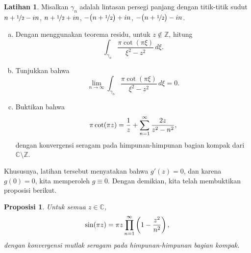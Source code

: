 \documentclass[12pt,openany]{book}
\newcommand{\avoidbreak}{\postdisplaypenalty=100}
\newcommand{\C}{{\mathbb{C}}}
\newcommand{\Z}{{\mathbb{Z}}}
\theoremstyle{plain}
\newtheorem{prop}[thm]{Proposisi}
\theoremstyle{remark}
\theoremstyle{definition}
\newenvironment{exbox}{%
    \def\FrameCommand{\vrule width 1pt \relax\hspace{10pt}}%
    \MakeFramed{\advance\hsize-\width\FrameRestore}%
}{%
    \endMakeFramed
}
\newenvironment{exparts}{%
    \leavevmode\begin{enumerate}[a),noitemsep,topsep=0pt,parsep=0pt,partopsep=0pt]
}{%
    \end{enumerate}
}
\theoremstyle{exercise}
\newtheorem{exercise}{Latihan}[section]
\theoremstyle{example}
\begin{document}
\begin{exbox}
\begin{exercise}
Misalkan $\gamma_n$ adalah lintasan persegi panjang dengan titik-titik sudut
$n+\nicefrac{1}{2} - in$, 
$n+\nicefrac{1}{2} + in$, 
$-\bigl(n+\nicefrac{1}{2}\bigr) + in$, 
$-\bigl(n+\nicefrac{1}{2}\bigr) - in$.
\begin{exparts}
\item
Dengan menggunakan teorema residu, untuk $z \notin \Z$, hitung
\begin{equation*}
\int_{\gamma_n}\frac{\pi \cot (\pi \xi)}{\xi^2-z^2} \, d\xi .
\end{equation*}
\item
Tunjukkan bahwa
\begin{equation*}
\lim_{n\to \infty}
\int_{\gamma_n}\frac{\pi \cot (\pi \xi)}{\xi^2-z^2} \, d\xi = 0 .
\end{equation*}
\item
Buktikan bahwa
\begin{equation*}
\pi \cot (\pi z) =
\frac{1}{z}
+
\sum_{n=1}^\infty 
\frac{2z}{z^2-n^2} ,
\avoidbreak
\end{equation*}
dengan konvergensi seragam pada himpunan-himpunan bagian kompak dari $\C \setminus \Z$.
\end{exparts}
\end{exercise}
\end{exbox}

Khususnya, latihan tersebut menyatakan bahwa $g'(z)=0$, dan karena $g(0)=0$, kita memperoleh $g \equiv 0$.
Dengan demikian, kita telah membuktikan proposisi berikut.

\begin{prop}
Untuk semua $z \in \C$,
\begin{equation*}
\sin(\pi z) =
\pi z \prod_{n=1}^\infty 
\left(1-\frac{z^2}{n^2}\right) ,
\avoidbreak
\end{equation*}
dengan konvergensi mutlak seragam pada himpunan-himpunan bagian kompak.
\end{prop}
\end{document}
